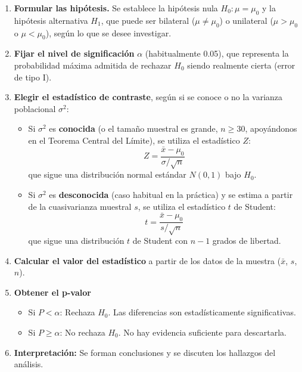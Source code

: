 \documentclass[11pt, a4paper]{article}
\begin{document}
\begin{enumerate}
  \item \textbf{Formular las hipótesis.} Se establece la hipótesis nula $H_0: \mu = \mu_0$ 
  y la hipótesis alternativa $H_1$, que puede ser bilateral ($\mu \neq \mu_0$) o unilateral 
  ($\mu > \mu_0$ o $\mu < \mu_0$), según lo que se desee investigar.

  \item \textbf{Fijar el nivel de significación} $\alpha$ (habitualmente 0.05), que 
  representa la probabilidad máxima admitida de rechazar $H_0$ siendo realmente cierta 
  (error de tipo I).

  \item \textbf{Elegir el estadístico de contraste}, según si se conoce o no la varianza 
  poblacional $\sigma^2$:
  \begin{itemize}
    \item Si $\sigma^2$ es \textbf{conocida} (o el tamaño muestral es grande, $n \geq 30$, 
    apoyándonos en el Teorema Central del Límite), se utiliza el estadístico $Z$:
    \[
    Z = \frac{\bar{x} - \mu_0}{\sigma / \sqrt{n}}
    \]
    que sigue una distribución normal estándar $N(0,1)$ bajo $H_0$.

    \item Si $\sigma^2$ es \textbf{desconocida} (caso habitual en la práctica) y se estima 
    a partir de la cuasivarianza muestral $s$, se utiliza el estadístico $t$ de Student:
    \[
    t = \frac{\bar{x} - \mu_0}{s / \sqrt{n}}
    \]
    que sigue una distribución $t$ de Student con $n-1$ grados de libertad.
  \end{itemize}

  \item \textbf{Calcular el valor del estadístico} a partir de los datos de la muestra 
  ($\bar{x}$, $s$, $n$).

  \item \textbf{Obtener el p-valor} 
  \begin{itemize}
    \item Si $P < \alpha$: Rechaza $H_0$. Las diferencias son estadísticamente significativas.
    \item Si $P \geq \alpha$: No rechaza $H_0$. No hay evidencia suficiente para descartarla.
  \end{itemize}

  \item \textbf{Interpretación:} Se forman conclusiones y se discuten los hallazgos del análisis.
\end{enumerate}
\end{document}
